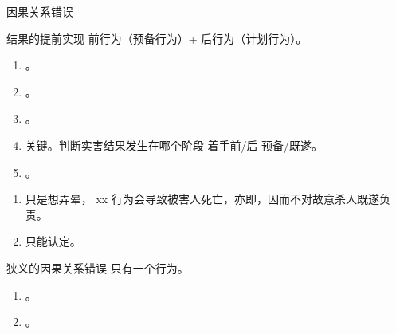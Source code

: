 \begin{enumerate}
\begin{enumerate}
\begin{enumerate}
\begin{kk}{因果关系错误}
                          \begin{kk}{结果的提前实现}
                            前行为（预备行为）+ 后行为（计划行为）。
                            \begin{enumerate}
                              \item {}。
                              \item {}。
                              \item {}。
                              \item 关键。判断实害结果发生在哪个阶段 \yjt 着手前/后 \yjt 预备/既遂。
                              \item {}。
                            \end{enumerate}
                            \tcblower
                            \begin{enumerate}
                              \item {}只是想弄晕， xx 行为会导致被害人死亡，亦即，因而不对故意杀人既遂负责。
                              \item 只能认定。
                            \end{enumerate}
                          \end{kk}

                          \begin{kk}{狭义的因果关系错误}
                            只有一个行为。
                            \begin{enumerate}
                              \item {}。
                              \item {}。
                            \end{enumerate}
                          \end{kk}
                        \end{kk}


\end{enumerate}
\end{enumerate}
\end{enumerate}
